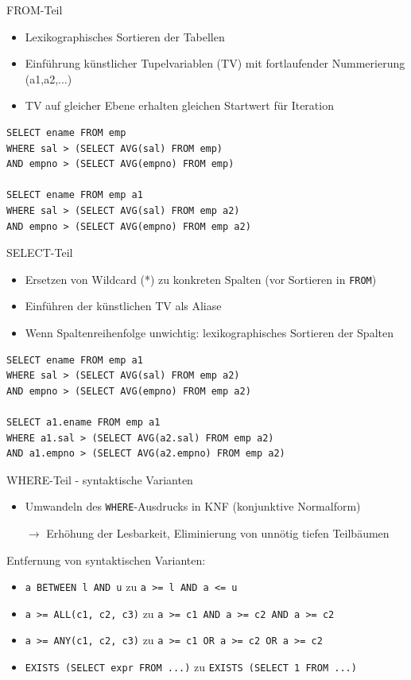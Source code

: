 \documentclass{beamer}
\begin{document}

\begin{frame}[fragile]{FROM-Teil}
\begin{itemize}
\item Lexikographisches Sortieren der Tabellen
\item Einführung künstlicher Tupelvariablen (TV) mit fortlaufender Nummerierung (a1,a2,...)
\item TV auf gleicher Ebene erhalten gleichen Startwert für Iteration
\end{itemize}

\begin{verbatim}
SELECT ename FROM emp
WHERE sal > (SELECT AVG(sal) FROM emp)
AND empno > (SELECT AVG(empno) FROM emp)

SELECT ename FROM emp a1
WHERE sal > (SELECT AVG(sal) FROM emp a2)
AND empno > (SELECT AVG(empno) FROM emp a2)
\end{verbatim}
\end{frame}

\begin{frame}[fragile]{SELECT-Teil}
\begin{itemize}
\item Ersetzen von Wildcard (*) zu konkreten Spalten (vor Sortieren in \verb|FROM|)
\item Einführen der künstlichen TV als Aliase
\item Wenn Spaltenreihenfolge unwichtig: lexikographisches Sortieren der Spalten
\end{itemize}

\begin{verbatim}
SELECT ename FROM emp a1
WHERE sal > (SELECT AVG(sal) FROM emp a2)
AND empno > (SELECT AVG(empno) FROM emp a2)

SELECT a1.ename FROM emp a1
WHERE a1.sal > (SELECT AVG(a2.sal) FROM emp a2)
AND a1.empno > (SELECT AVG(a2.empno) FROM emp a2)
\end{verbatim}
\end{frame}


\begin{frame}[fragile]{WHERE-Teil - syntaktische Varianten}
\begin{itemize}
\item Umwandeln des \verb|WHERE|-Ausdrucks in KNF (konjunktive Normalform) 
\item[$\to$] Erhöhung der Lesbarkeit, Eliminierung von unnötig tiefen Teilbäumen
\end{itemize}
Entfernung von syntaktischen Varianten:
\begin{itemize}
\item \verb|a BETWEEN l AND u| zu \verb|a >= l AND a <= u|
\item \verb|a >= ALL(c1, c2, c3)| zu \verb|a >= c1 AND a >= c2 AND a >= c2|
\item \verb|a >= ANY(c1, c2, c3)| zu \verb|a >= c1 OR a >= c2 OR a >= c2|
\item \verb|EXISTS (SELECT expr FROM ...)| zu \verb|EXISTS (SELECT 1 FROM ...)|
\end{itemize}
\end{frame}
\end{document}
